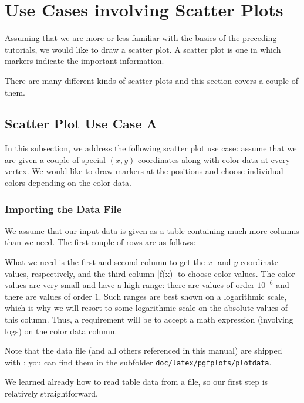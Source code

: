 
\section{Use Cases involving Scatter Plots}

Assuming that we are more or less familiar with the basics of the preceding
tutorials, we would like to draw a scatter plot. A scatter plot is one in which
markers indicate the important information.

There are many different kinds of scatter plots and this section covers a
couple of them.

\subsection{Scatter Plot Use Case A}
\label{sec:tut3:usecaseA}

In this subsection, we address the following scatter plot use case: assume that
we are given a couple of special $(x,y)$ coordinates along with color data at
every vertex. We would like to draw markers at the positions and choose
individual colors depending on the color data.


\subsubsection{Importing the Data File}

We assume that our input data is given as a table containing much more columns
than we need. The first couple of rows are as follows:

    

What we need is the first and second column to get the $x$- and $y$-coordinate
values, respectively, and the third column |f(x)| to choose color values. The
color values are very small and have a high range: there are values of order
$10^{-6}$ and there are values of order $1$. Such ranges are best shown on a
logarithmic scale, which is why we will resort to some logarithmic scale on the
absolute values of this column. Thus, a requirement will be to accept a math
expression (involving logs) on the color data column.

Note that the data file (and all others referenced in this manual) are shipped
with \PGFPlots{}; you can find them in the subfolder
\texttt{doc/latex/pgfplots/plotdata}.

We learned already how to read table data from a file, so our first step is
relatively straightforward.

